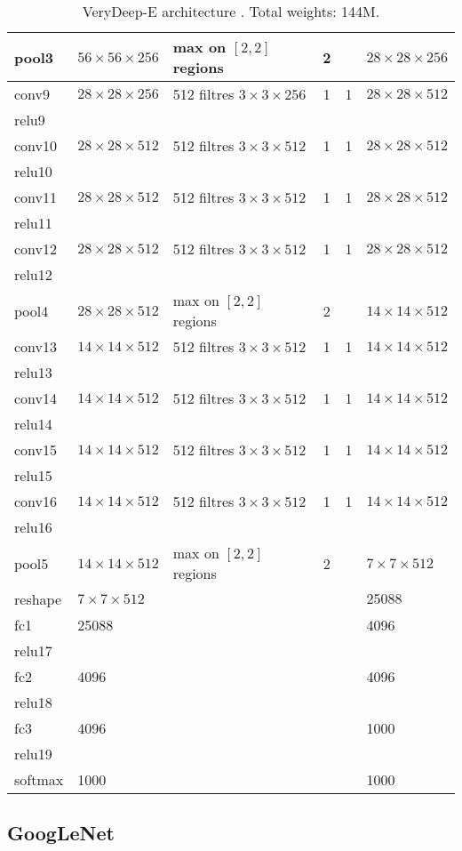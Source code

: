 \begin{table}[h]
\begin{center}
\begin{tabular}{|l||l||l|c|c||l|}
	\hline
pool3	& $56 \times 56 \times 256$	& max on $[2,2]$ regions	& 2	&	& $28 \times 28 \times 256$	\\
	\hline
conv9	& $28 \times 28 \times 256$	& 512 filtres $3 \times 3 \times 256$	& 1	& 1	& $28 \times 28 \times 512$	\\
relu9	&	&	&	&	&	\\
conv10	& $28 \times 28 \times 512$	& 512 filtres $3 \times 3 \times 512$	& 1	& 1	& $28 \times 28 \times 512$	\\
relu10	&	&	&	&	&	\\
conv11	& $28 \times 28 \times 512$	& 512 filtres $3 \times 3 \times 512$	& 1	& 1	& $28 \times 28 \times 512$	\\
relu11	&	&	&	&	&	\\
conv12	& $28 \times 28 \times 512$	& 512 filtres $3 \times 3 \times 512$	& 1	& 1	& $28 \times 28 \times 512$	\\
relu12	&	&	&	&	&	\\
	\hline
pool4	& $28 \times 28 \times 512$	& max on $[2,2]$ regions	& 2	&	& $14 \times 14 \times 512$	\\
	\hline
conv13	& $14 \times 14 \times 512$	& 512 filtres $3 \times 3 \times 512$	& 1	& 1	& $14 \times 14 \times 512$	\\
relu13	&	&	&	&	&	\\
conv14	& $14 \times 14 \times 512$	& 512 filtres $3 \times 3 \times 512$	& 1	& 1	& $14 \times 14 \times 512$	\\
relu14	&	&	&	&	&	\\
conv15	& $14 \times 14 \times 512$	& 512 filtres $3 \times 3 \times 512$	& 1	& 1	& $14 \times 14 \times 512$	\\
relu15	&	&	&	&	&	\\
conv16	& $14 \times 14 \times 512$	& 512 filtres $3 \times 3 \times 512$	& 1	& 1	& $14 \times 14 \times 512$	\\
relu16	&	&	&	&	&	\\
	\hline
pool5	& $14 \times 14 \times 512$	& max on $[2,2]$ regions	& 2	&	& $7 \times 7 \times 512$	\\
reshape	& $7 \times 7 \times 512$	& & & & $25088$	\\
	\hline
fc1	& 25088	& 	& 	& 	& 4096	\\
relu17	&	&	&	&	&	\\
fc2	& 4096	& 	& 	& 	& 4096	\\
relu18	&	&	&	&	&	\\
fc3	& 4096	& 	& 	& 	& 1000	\\
relu19	&	&	&	&	&	\\
	\hline
softmax	& 1000	&	&	&	& 1000	\\
    \hline
 \end{tabular}
 \caption{VeryDeep-E architecture \cite{Chevalier15}. Total weights: 144M.}
 \label{table:LR-CNN}
\end{center}
\end{table} 

\subsection{GoogLeNet}